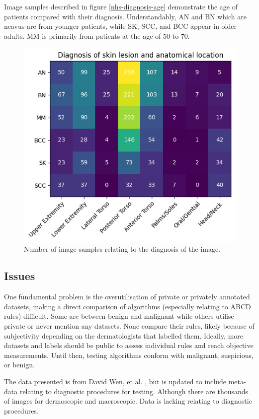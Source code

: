 Image samples described in figure \ref{nhs-diagnosis-age} demonstrate the age of patients compared with their diagnosis. Understandably, AN and BN which are neavus are from younger patients, while SK, SCC, and BCC appear in older adults. MM is primarily from patients at the age of 50 to 70.

\begin{figure}
	\centering
	\includegraphics[scale=0.8]{images/nhs/nhs-location-diagnosis.png}
	\caption{Number of image samples relating to the diagnosis of the image.} 
\end{figure}\label{nhs-location-diagnosis}




\subsection{Issues}
One fundamental problem is the overutilisation of private or privately annotated datasets, making a direct comparison of algorithms (especially relating to ABCD rules) difficult. Some are between benign and malignant\cite{Meskini2018, Kasmi2016, Ali2020b, Ali2020a} while others utilise private or never mention any datasets\cite{Kasmi2016, She2007, Tenenhaus2010, Ramezani2014, Zaqout2016}. None compare their rules, likely because of subjectivity depending on the dermatologists that labelled them. Ideally, more datasets and labels should be public to assess individual rules and reach objective measurements. Until then, testing algorithms conform with malignant, suspicious, or benign.


The data presented is from David Wen, et al. \cite{Wen2022}, but is updated to include meta-data relating to diagnostic procedures for testing. Although there are thousands of images for dermoscopic and macroscopic. Data is lacking relating to diagnostic procedures.